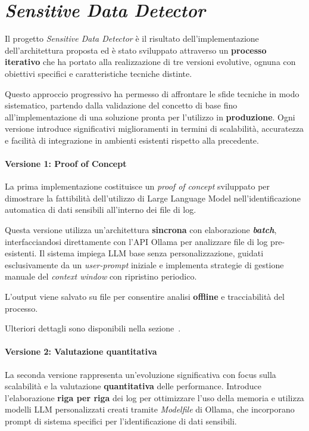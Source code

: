 \documentclass[12pt,twoside]{report}
\begin{document}
\cleardoublepage
\chapter{\textit{Sensitive Data Detector}}
\label{chap:sensitive_data_detector}

Il progetto \textit{Sensitive Data Detector} è il risultato dell'implementazione dell'architettura proposta ed è stato sviluppato attraverso un \textbf{processo iterativo} che ha portato alla realizzazione di tre versioni evolutive, ognuna con obiettivi specifici e caratteristiche tecniche distinte.

Questo approccio progressivo ha permesso di affrontare le sfide tecniche in modo sistematico, partendo dalla validazione del concetto di base fino all'implementazione di una soluzione pronta per l'utilizzo in \textbf{produzione}. Ogni versione introduce significativi miglioramenti in termini di scalabilità, accuratezza e facilità di integrazione in ambienti esistenti rispetto alla precedente.

\subsubsection{Versione 1: Proof of Concept}

La prima implementazione costituisce un \textit{proof of concept} sviluppato per dimostrare la fattibilità dell'utilizzo di Large Language Model nell'identificazione automatica di dati sensibili all'interno dei file di log.

Questa versione utilizza un'architettura \textbf{sincrona} con elaborazione \textbf{\textit{batch}}, interfacciandosi direttamente con l'API Ollama per analizzare file di log pre-esistenti. Il sistema impiega LLM base senza personalizzazione, guidati esclusivamente da un \textit{user-prompt} iniziale e implementa strategie di gestione manuale del \textit{context window} con ripristino periodico.

L'output viene salvato su file per consentire analisi \textbf{offline} e tracciabilità del processo.

Ulteriori dettagli sono disponibili nella sezione~.

\subsubsection{Versione 2: Valutazione quantitativa}

La seconda versione rappresenta un'evoluzione significativa con focus sulla scalabilità e la valutazione \textbf{quantitativa} delle performance. Introduce l'elaborazione \textbf{riga per riga} dei log per ottimizzare l'uso della memoria e utilizza modelli LLM personalizzati creati tramite \textit{Modelfile} di Ollama, che incorporano prompt di sistema specifici per l'identificazione di dati sensibili.
\end{document}
